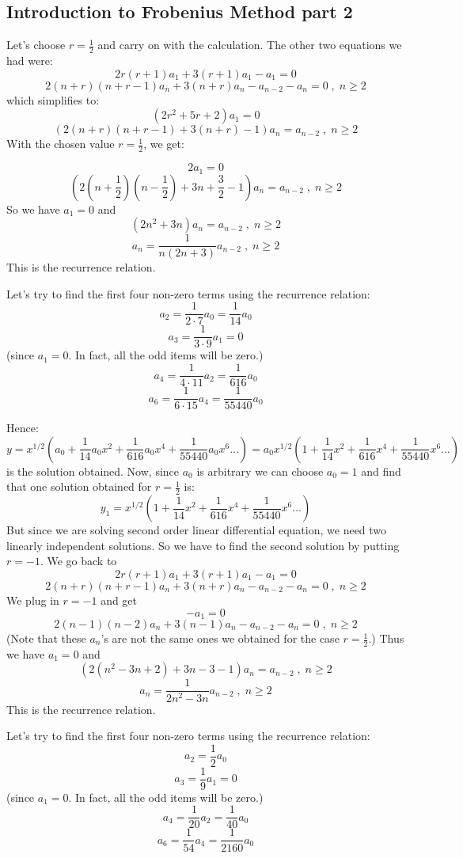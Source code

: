 \documentclass[12pt]{report}
\begin{document}
\subsection*{Introduction to Frobenius Method part 2 }
Let's choose $r = \frac{1}{2} $ and carry on with the calculation. The other two equations we had were:
$$ 2r(r+1)a_1 + 3(r+1)a_1 - a_1 = 0 $$
$$ 2(n+r)(n+r-1)a_n +  3(n+r)a_n - a_{n-2} - a_n =0 \;  ,  \; n\geq 2$$
which simplifies to:
$$ (2r^2+ 5r +2 )a_1 = 0 $$
$$ \left( 2(n+r)(n+r-1) + 3(n+r) -1 \right)a_n  = a_{n-2}  \;  ,  \; n\geq 2$$
With the chosen value $r = \frac{1}{2} $, we get:

$$2 a_1 =0 $$
$$ \left( 2(n+\frac{1}{2})(n-\frac{1}{2}) + 3n +\frac{3}{2}-1 \right) a_n  = a_{n-2}  \;  ,  \; n\geq 2$$
So we have $a_1=0$ and
$$ \left( 2n^2 +3n \right) a_n  = a_{n-2}  \;  ,  \; n\geq 2$$
$$ a_n = \frac{1}{n(2n + 3)} a_{n-2}  \;  ,  \; n\geq 2$$
This is the recurrence relation.

Let's try to find the first four non-zero terms using the recurrence relation:
$$a_2 = \frac{1}{2\cdot 7} a_{0} = \frac{1}{14} a_{0} $$
$$a_3 = \frac{1}{3\cdot 9} a_{1} = 0 $$
(since $a_1=0$. In fact, all the odd items will be zero.)
$$a_4 = \frac{1}{4\cdot 11} a_{2} = \frac{1}{616} a_{0} $$
$$a_6 = \frac{1}{6\cdot 15} a_{4} = \frac{1}{55440} a_{0} $$

Hence:
$$y = x^{1/2} \left( a_0 + \frac{1}{14} a_{0} x^2 + \frac{1}{616} a_{0} x^4 + \frac{1}{55440} a_{0} x^6 \dots \right)= a_0 x^{1/2}  \left( 1+ \frac{1}{14}  x^2 + \frac{1}{616} x^4 + \frac{1}{55440} x^6 \dots \right)$$
is the solution obtained. Now, since $a_0$ is arbitrary we can choose $a_0=1$ and find that one solution obtained for $r=\frac{1}{2}$ is:
$$y_1 = x^{1/2}  \left( 1+ \frac{1}{14}  x^2 + \frac{1}{616} x^4 + \frac{1}{55440} x^6 \dots \right)$$
But since we are solving second order linear differential equation, we need two linearly independent solutions. So we have to find the second solution by putting $r=-1$. We go back to 
$$ 2r(r+1)a_1 + 3(r+1)a_1 - a_1 = 0 $$
$$ 2(n+r)(n+r-1)a_n +  3(n+r)a_n - a_{n-2} - a_n =0 \;  ,  \; n\geq 2$$
We plug in $r=-1$ and get
$$ - a_1 = 0 $$
$$ 2(n-1)(n-2)a_n +  3(n-1)a_n - a_{n-2} - a_n =0 \;  ,  \; n\geq 2$$
(Note that these $a_n$'s are not the same ones we obtained for the case $r=\frac{1}{2}$.) Thus we have $a_1=0$ and 
$$ \left( 2(n^2-3n+2)+3n-3 -1 \right) a_n = a_{n-2}\;  ,  \; n\geq 2$$
$$ a_n = \frac{1}{2n^2 -3n} a_{n-2}\;  ,  \; n\geq 2$$
This is the recurrence relation. 

Let's try to find the first four non-zero terms using the recurrence relation:
$$a_2 = \frac{1}{2} a_{0}  $$
$$a_3 = \frac{1}{9} a_{1} = 0 $$
(since $a_1=0$. In fact, all the odd items will be zero.)
$$a_4 = \frac{1}{20} a_{2} = \frac{1}{40} a_{0} $$
$$a_6 = \frac{1}{54} a_{4} = \frac{1}{2160} a_{0} $$
\end{document}
